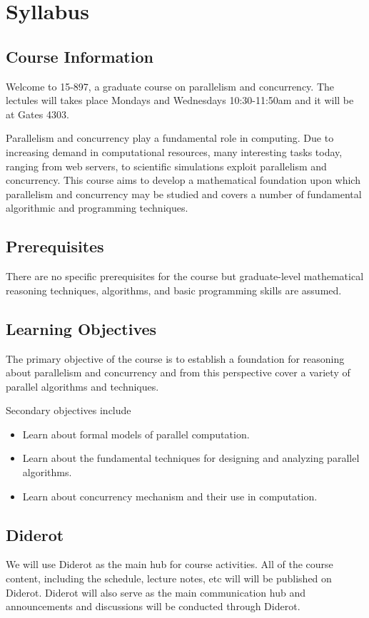 \chapter{Syllabus}
\label{ch:syllabus}

\section{Course Information}

Welcome to 15-897, a graduate course on parallelism and concurrency. 
%
The lectules will takes place Mondays and Wednesdays 10:30-11:50am and it will be at Gates 4303. 

Parallelism and concurrency play a  fundamental role in computing.
%
Due to increasing demand in computational resources, many interesting tasks today, ranging from web servers, to scientific simulations exploit parallelism and concurrency.
%
This course aims to develop a mathematical foundation upon which parallelism and concurrency may be studied and covers a number of fundamental algorithmic and programming techniques.  
%
 


\section{Prerequisites}
There are no specific prerequisites for the course but graduate-level mathematical reasoning techniques, algorithms, and basic programming skills are assumed.
%

\section{Learning Objectives}

The primary objective of the course is to establish a foundation for reasoning about parallelism and concurrency and from this perspective cover a variety of parallel algorithms and techniques.

Secondary objectives include
\begin{itemize}
\item Learn about formal models of parallel computation.
\item Learn about the fundamental techniques for designing and analyzing parallel algorithms.
\item Learn about concurrency mechanism and their use in computation. 
\end{itemize}


\section{Diderot}
We will use Diderot as the main hub for course activities.
%
All of the course content, including the schedule, lecture notes, etc will 
will be published on Diderot. 
%
Diderot will also serve as the main communication hub and
announcements and discussions will be conducted through Diderot.
%


